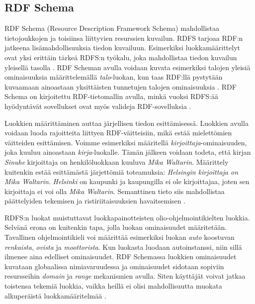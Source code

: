 \documentclass[finnish, 12pt, a4paper, elec, utf8, pdfa, online]{aaltothesis}
\begin{document}
{\subsection{RDF Schema}
RDF Schema (Resource Description Framework Schema) mahdollistaa tietojoukkojen ja toisiinsa liittyvien resurssien kuvailun. RDFS tarjoaa RDF:n jatkeena lisämahdollisuuksia tiedon kuvailuun. Esimerkiksi luokkamäärittelyt ovat yksi erittäin tärkeä RDFS:n työkalu, joka mahdollistaa tiedon kuvailun yleisellä tasolla \cite{W3C_RDFS2}. RDF Scheman avulla voidaan kuvata esimerkiksi talojen yleisiä ominaisuuksia määrittelemällä \textit{talo}-luokan, kun taas RDF:llä pystytään kuvaamaan ainoastaan yksittäisten tunnetujen talojen ominaisuuksia \cite{Antoniou}. RDF Schema on kirjoitettu RDF-tietomallin avulla, minkä vuoksi RDFS:ää hyödyntävät sovellukset ovat myös valideja RDF-sovelluksia \cite{RDF_specification_old}.

Luokkien määrittäminen auttaa järjellisen tiedon esittämisessä. Luokkien avulla voidaan luoda rajoitteita liittyen RDF-väitteisiin, mikä estää mielettömien väitteiden esittämisen. Voimme esimerkiksi määritellä \textit{kirjoittaja}-ominaisuuden, joka kuuluu ainoastaan \textit{kirja}-luokalle. Tämän jälkeen voidaan todeta, että kirjan \textit{Sinuhe} kirjoittaja on henkilöluokkaan kuuluva \textit{Mika Waltarin}. Määrittely kuitenkin estää esittämästä järjettömiä toteamuksia: \textit{Helsingin kirjoittaja on Mika Waltarin}. \textit{Helsinki} on kaupunki ja kaupungilla ei ole kirjoittajaa, joten sen kirjoittaja ei voi olla \textit{Mika Waltarin}. Semanttinen tieto siis mahdollistaa päättelyiden tekemisen ja ristiriitaisuuksien havaitsemisen \cite{Antoniou}.

RDFS:n luokat muistuttavat luokkapainotteisten olio-ohjelmointikielten luokkia. Selvänä erona on kuitenkin tapa, jolla luokan ominaisuudet määritetään. Tavallinen ohjelmointikieli voi määrittää esimerkiksi luokan \textit{auto} koostuvan \textit{renkaista}, \textit{ovista} ja \textit{moottorista}. Kun luokasta luodaan autoinstanssi, niin sillä ilmenee aina edelliset ominaisuudet. RDF Schemassa luokkien ominaisuudet kuvataan globaalissa nimiavaruudessa ja ominaisuudet sidotaan sopiviin resursseihin \textit{domain} ja \textit{range} mekanismien avulla. Siten käyttäjät voivat jatkaa toistensa tekemiä luokkia, vaikka heillä ei olisi mahdollisuutta muokata alkuperäistä luokkamääritelmää \cite{Antoniou} \cite{W3C_RDFS2}.

}
\end{document}
